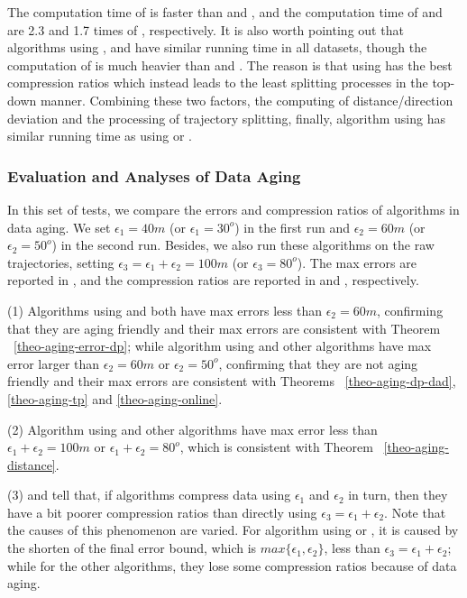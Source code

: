 {
The computation time of \dad is faster than \ped and \sed, and the computation time of \ped and \sed are 2.3 and 1.7 times of \dad, respectively.
{It is also worth pointing out that algorithms \dpa using \ped, \sed and \dad have similar running time in all datasets, though the computation of \ped is much heavier than \sed and \dad. The reason is that \dpa using \ped has the best compression ratios which instead leads to the least splitting processes in the top-down manner. Combining these two factors, \ie the computing of distance/direction deviation and the processing of trajectory splitting, finally, algorithm \dpa using \ped has similar running time as \dpa using \dad or \sed.}

\subsubsection{{Evaluation and Analyses of Data Aging}}
\label{sec:exp-data-aging}
In this set of tests, we compare the errors and compression ratios of algorithms in data aging. We set $\epsilon_1=40m$ (or $\epsilon_1=30^o$) in the first run and $\epsilon_2=60m$ (or $\epsilon_2=50^o$) in the second run. Besides, we also run these algorithms on the raw trajectories, setting $\epsilon_3=\epsilon_1 + \epsilon_2=100m$ (or $\epsilon_3=80^o$). The max errors are reported in , and the compression ratios are reported in  and , respectively.

\ni (1) Algorithms \dpa using \ped and \sed both have max errors less than $\epsilon_2 = 60m$, confirming that they are aging friendly and their max errors are consistent with Theorem ~\ref{theo-aging-error-dp}; while algorithm \dpa using \dad and other algorithms have max error larger than $\epsilon_2 = 60m$ or $\epsilon_2 = 50^o$, confirming that they are not aging friendly and their max errors are consistent with Theorems ~\ref{theo-aging-dp-dad}, \ref{theo-aging-tp} and \ref{theo-aging-online}.

\ni (2) Algorithm \dpa using \dad and other algorithms have max error less than $\epsilon_1 + \epsilon_2 = 100m$ or $\epsilon_1 + \epsilon_2 = 80^o$, which is consistent with Theorem ~\ref{theo-aging-distance}.

\ni (3)  and  tell that, if algorithms compress data using $\epsilon_1$ and $\epsilon_2$ in turn, then they have a bit poorer compression ratios than directly using $\epsilon_3=\epsilon_1 + \epsilon_2$.
Note that the causes of this phenomenon are varied. For algorithm \dpa using \ped or \sed, it is caused by the shorten of the final error bound, which is $max\{\epsilon_1, \epsilon_2\}$, less than $\epsilon_3=\epsilon_1 + \epsilon_2$; while for the other algorithms, they lose some compression ratios because of data aging.

}
